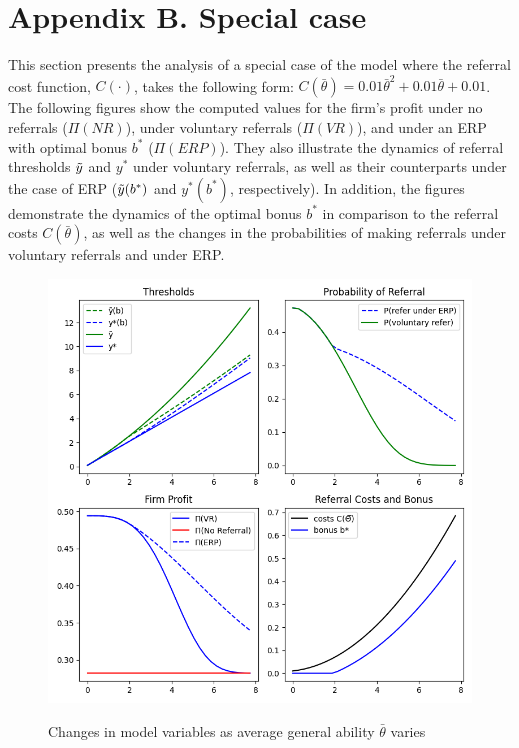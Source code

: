 \documentclass[12pt]{article}
\begin{document}
\pagebreak




\section*{Appendix B. Special case} \label{sec:appendixb}
This section presents the analysis of a special case of the model where the referral cost function, $C(\cdot)$, takes the following form: $C(\bar{\theta}) = 0.01 \bar{\theta}^2 + 0.01 \bar{\theta} + 0.01$. The following figures show the computed values for the firm's profit under no referrals ($\Pi (NR)$), under voluntary referrals ($\Pi(VR)$), and under an ERP with optimal bonus $b^*$ ($\Pi(ERP)$). They also illustrate the dynamics of referral thresholds $\Tilde{y}$ and $y^*$ under voluntary referrals, as well as their counterparts under the case of ERP ($\Tilde{y}(b^*)$ and $y^*(b^*)$, respectively). In addition, the figures demonstrate the dynamics of the optimal bonus $b^*$ in comparison to the referral costs $C(\bar{\theta})$, as well as the changes in the probabilities of making referrals under voluntary referrals and under ERP.

\begin{figure}[ht]
    \caption{Changes in model variables as average general ability $\bar{\theta}$ varies}
    \includegraphics[width=12cm]{images/imperf_means_var.png}
    \centering
    \label{fig:mean_var}
\end{figure}
\end{document}
